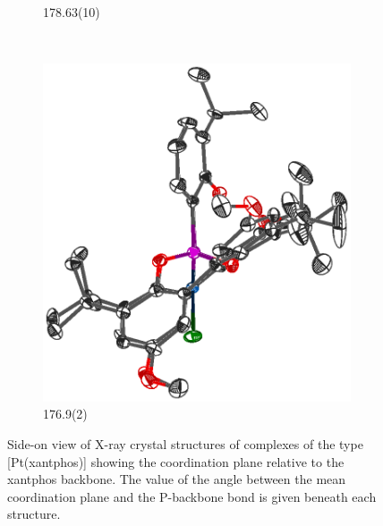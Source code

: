 \begin{figure}[htbp]
\begin{subfigure}[b]{0.4\textwidth}
                \caption{178.63(10)\degrees{}\cite{Mora2008}}
                \label{PtCl2BINAPside}
        \end{subfigure}
        ~
        \begin{subfigure}[b]{0.4\textwidth}
                \includegraphics[width=\textwidth]{../Othercrystals/PtCl2/220613side.eps}
                \caption{176.9(2)\degrees{}\cite{Vlugt2003}}
                \label{PtCl2side}
        \end{subfigure}
        \caption[Side-on view of X-ray crystal structures of complexes of the type [Pt(xantphos){]}]{Side-on view of X-ray crystal structures of complexes of the type [Pt(xantphos)] showing the coordination plane relative to the xantphos backbone. The value of the angle between the mean coordination plane and the P-backbone bond is given beneath each structure.}
        \label{crystal:otherPtCl2side}
\end{figure}

